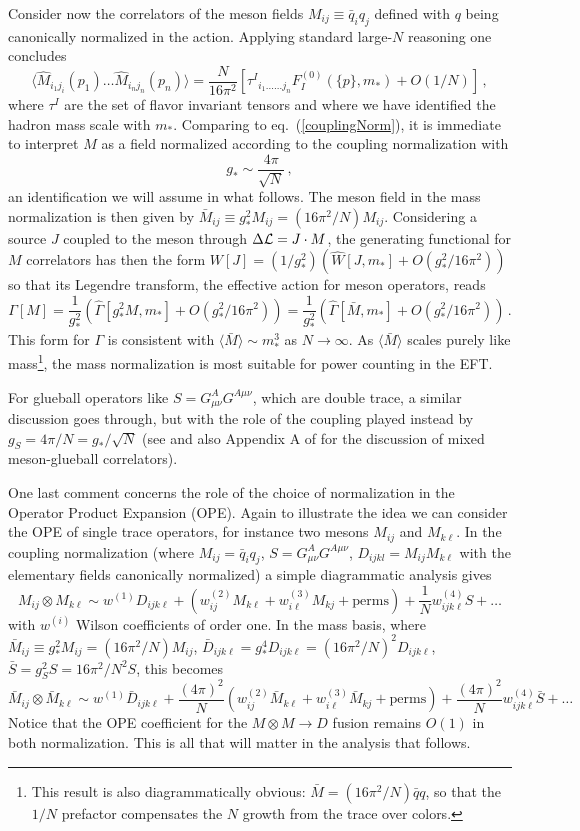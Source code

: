 \documentclass[a4paper,12pt]{article}
\newcommand{\beq}{\begin{equation}}
\newcommand{\eeq}{\end{equation}}
\def\eq#1{eq.~(\ref{#1})}
\def\eq#1{eq.~(\ref{#1})}
\def\mst{m_*}
\begin{document}
Consider now the correlators of the meson fields $M_{ij}\equiv {\bar q}_i q_j$ defined with $q$ being canonically normalized in the
action. Applying standard large-$N$ reasoning one concludes 
\beq
\langle \hat M_{i_1 j_i}(p_1)\dots \hat M_{i_n j_n}(p_n) \rangle = \frac{N}{16\pi^2}\left [ {\tau^I}_{i_1...\dots j_n} F_I^{(0)}(\{p\},\mst)+O(1/N)\right ] \, ,
\eeq
where ${\tau^I}$ are the set of flavor invariant tensors and where we have identified the hadron mass scale with $\mst$. Comparing to \eq{couplingNorm}, it is immediate to interpret $M$ as a field normalized according to the coupling normalization with  
\beq
g_*\sim \frac{4\pi}{\sqrt N}\,,
\eeq 
an identification  we will assume in what follows. The meson field in the mass normalization is then given by $\bar{M}_{ij}\equiv g_*^2 M_{ij}=
(16\pi^2/N) M_{ij}$. Considering a source $J$ coupled to the meson through $\Delta {\cal L}=J\cdot M$, the generating functional for $M$ correlators  has then the form $W[J]=(1/g_*^2)\left (\hat W[J,\mst]+O(g_*^2/16\pi^2)\right)$ so that its Legendre transform, the effective action for meson operators, reads
\beq
\Gamma[M]=\frac{1}{g_*^2}\left (\hat \Gamma[g_*^2 M,\mst]+O(g_*^2/16\pi^2)\right )= \frac{1}{g_*^2}\left (\hat \Gamma[\bar M,\mst]+O(g_*^2/16\pi^2)\right )\,.
\eeq
This form for $\Gamma$  is consistent with $\langle \bar M\rangle\sim \mst^3$ as $N\to \infty$. As $\langle \bar M \rangle$ scales purely like mass\footnote{This result is also diagrammatically obvious: $\bar M=(16\pi^2/N) \bar q q$, so that the $1/N$ prefactor compensates  the $N$ growth   from the trace over colors.},
 the mass normalization is most suitable for power counting in the EFT. 
 
 For glueball operators like $S=G_{\mu\nu}^AG^{A\mu\nu}$, which are double trace, a similar discussion goes through, but with the role of the coupling played instead by $g_S=4\pi/N=g_*/\sqrt N$ (see \cite{Coleman:1985rnk} and also  Appendix A of
 \cite{Glioti:2024hye} for the discussion of mixed meson-glueball correlators).
 
One last comment concerns the role of the choice of normalization in the Operator Product Expansion (OPE). Again to illustrate the idea we can consider the OPE of single trace operators, for instance two mesons $M_{ij}$ and $M_{k\ell}$. In the coupling normalization
(where $M_{ij}=\bar q_iq_j$, $S=G_{\mu\nu}^AG^{A\mu\nu}$, $D_{ijkl}=M_{ij}M_{k\ell}$ with the elementary fields canonically normalized) a simple diagrammatic analysis gives
\beq
M_{ij} \otimes M_{k\ell}\sim w^{(1)} D_{ijk\ell} + \left (w^{(2)}_{ij}M_{k\ell}+w^{(3)}_{i\ell}M_{kj}+{\mathrm{perms}}\right)+\frac{1}{N}w^{(4)}_{ijk\ell} S+\dots
\eeq
with $w^{(i)}$ Wilson coefficients of order one. In the mass basis, where $\bar{M}_{ij}\equiv g_*^2 M_{ij}=
(16\pi^2/N) M_{ij}$, $\bar{D}_{ijk\ell}=g_*^4 {D}_{ijk\ell}=(16\pi^2/N)^2 D_{ijk\ell}$, $\bar S =g_S^2 S=16\pi^2/N^2 S$, this becomes
\beq
\bar M_{ij} \otimes \bar M_{k\ell}\sim w^{(1)} \bar D_{ijk\ell} + \frac {(4\pi)^2}{N}\left (w^{(2)}_{ij}\bar M_{k\ell}+w^{(3)}_{i\ell}\bar M_{kj}+{\mathrm{perms}}\right)+\frac{(4\pi)^2}{N}w^{(4)}_{ijk\ell} \bar S+\dots
\eeq
Notice that the OPE coefficient for the $M\otimes M\to D$ fusion remains $O(1)$ in both normalization. This is all that will matter in the analysis that follows.
\end{document}
